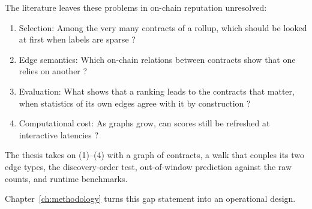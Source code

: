
The literature leaves these problems in on-chain reputation unresolved:

\begin{enumerate}
\item Selection: Among the very many contracts of a rollup, which should be looked at first when labels are sparse \parencite{lin2024whoiswho}?
\item Edge semantics: Which on-chain relations between contracts show that one relies on another \parencite{kitzler2023defi}?
\item Evaluation: What shows that a ranking leads to the contracts that matter, when statistics of its own edges agree with it by construction \parencite{cronbach1955construct}?
\item Computational cost: As graphs grow, can scores still be refreshed at interactive latencies \parencite{langville2006pagerank}?
\end{enumerate}

The thesis takes on (1)--(4) with a graph of contracts, a walk that couples its two edge types, the discovery-order test, out-of-window prediction against the raw counts, and runtime benchmarks.

Chapter~\ref{ch:methodology} turns this gap statement into an operational design.

